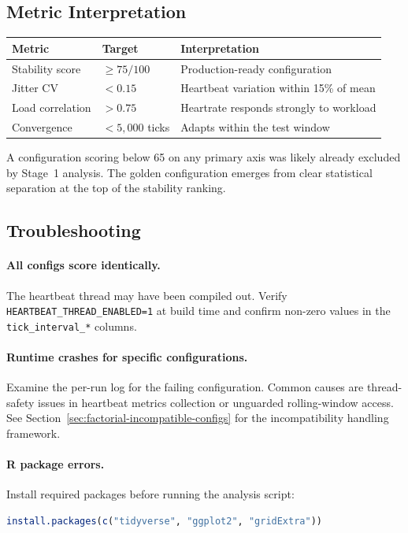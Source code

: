 \subsection{Metric Interpretation}

\begin{center}
\begin{tabular}{lll}
\toprule
Metric & Target & Interpretation \\
\midrule
Stability score & $\geq 75/100$ & Production-ready configuration \\
Jitter CV & $< 0.15$ & Heartbeat variation within 15\% of mean \\
Load correlation & $> 0.75$ & Heartrate responds strongly to workload \\
Convergence & $< 5{,}000$ ticks & Adapts within the test window \\
\bottomrule
\end{tabular}
\end{center}

A configuration scoring below 65 on any primary axis was likely already
excluded by Stage~1 analysis. The golden configuration emerges from clear
statistical separation at the top of the stability ranking.

\subsection{Troubleshooting}

\paragraph{All configs score identically.}
The heartbeat thread may have been compiled out. Verify
\texttt{HEARTBEAT\_THREAD\_ENABLED=1} at build time and confirm non-zero
values in the \texttt{tick\_interval\_*} columns.

\paragraph{Runtime crashes for specific configurations.}
Examine the per-run log for the failing configuration. Common causes are
thread-safety issues in heartbeat metrics collection or unguarded rolling-window
access. See Section~\ref{sec:factorial-incompatible-configs} for the incompatibility
handling framework.

\paragraph{R package errors.}
Install required packages before running the analysis script:
\begin{lstlisting}[language=R]
install.packages(c("tidyverse", "ggplot2", "gridExtra"))
\end{lstlisting}


